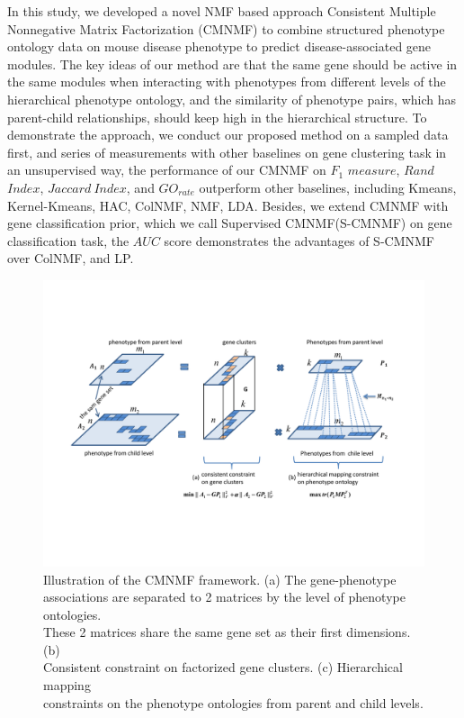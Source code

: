 \documentclass{bmcart}
\begin{document}
In this study, we developed a novel NMF based approach Consistent Multiple Nonnegative Matrix Factorization (CMNMF) to combine structured phenotype ontology data on mouse disease phenotype to predict disease-associated gene modules. The key ideas of our method are that the same gene should be active in the same modules when interacting with phenotypes from different levels of the hierarchical phenotype ontology, and the similarity of phenotype pairs, which has parent-child relationships, should keep high in the hierarchical structure. To demonstrate the approach, we conduct our proposed method on a sampled data first, and series of measurements with other baselines on gene clustering task in an unsupervised way, the performance of our CMNMF on $F_1$ $measure$, $Rand$ $Index$, $Jaccard\ Index$, and $GO_{rate}$ outperform other baselines, including Kmeans, Kernel-Kmeans\cite{Dhillon2004}, HAC\cite{Ward1963}, ColNMF\cite{Singh2008}, NMF\cite{Lee1999}, LDA\cite{Blei2003}. Besides, we extend CMNMF with gene classification prior, which we call Supervised CMNMF(S-CMNMF) on gene classification task, the $AUC$ score demonstrates the advantages of S-CMNMF over ColNMF, and LP\cite{Raghavan2007}.
\begin{figure}[!t]
  \centering
  \begin{minipage}{.80\linewidth}
  \centering
    \includegraphics[width=\linewidth]{DrawPictures/module2.pdf}
  \end{minipage}
  \caption{Illustration of the CMNMF framework. (a) The gene-phenotype \\ associations are separated to 2 matrices by the level of phenotype ontologies. \\These 2 matrices share the same gene set as their first dimensions. (b)\\ Consistent constraint on factorized gene clusters. (c) Hierarchical mapping \\ constraints on the phenotype ontologies from parent and child levels.}
  \label{fig:model}
\end{figure}
\end{document}
